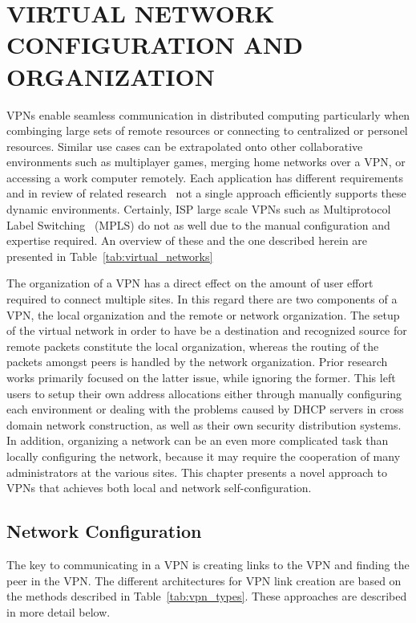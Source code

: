 \chapter{VIRTUAL NETWORK CONFIGURATION AND ORGANIZATION}
\label{chap:vpns}

VPNs enable seamless communication in distributed computing particularly when
combinging large sets of remote resources or connecting to centralized or
personel resources.  Similar use cases can be extrapolated onto other
collaborative environments such as multiplayer games, merging home networks
over a VPN, or accessing a work computer remotely.  Each application has
different requirements and in review of related research~\cite{ipop, vine,
violin, vnet, ocala, softudc, openvpn, hamachi, wippien, gbridge, pvc, tinc,
n2n, p2pvpn, l2tp} not a single approach efficiently supports these dynamic
environments.  Certainly, ISP large scale VPNs such as Multiprotocol Label
Switching~\cite{mpls} (MPLS) do not as well due to the manual configuration and
expertise required.  An overview of these and the one described herein are
presented in Table~\ref{tab:virtual_networks}

The organization of a VPN has a direct effect on the amount of user effort
required to connect multiple sites.  In this regard there are two components of
a VPN, the local organization and the remote or network organization.  The
setup of the virtual network in order to have be a destination and recognized
source for remote packets constitute the local organization, whereas the
routing of the packets amongst peers is handled by the network organization.
Prior research works primarily focused on the latter issue, while ignoring the
former.  This left users to setup their own address allocations either through
manually configuring each environment or dealing with the problems caused by
DHCP servers in cross domain network construction, as well as their own
security distribution systems.  In addition, organizing a network can be an
even more complicated task than locally configuring the network, because it may
require the cooperation of many administrators at the various sites.  This
chapter presents a novel approach to VPNs that achieves both local and network
self-configuration.

\section{Network Configuration} The key to communicating in a VPN is creating
links to the VPN and finding the peer in the VPN.  The different architectures
for VPN link creation are based on the methods described in
Table~\ref{tab:vpn_types}.  These approaches are described in more detail
below.

